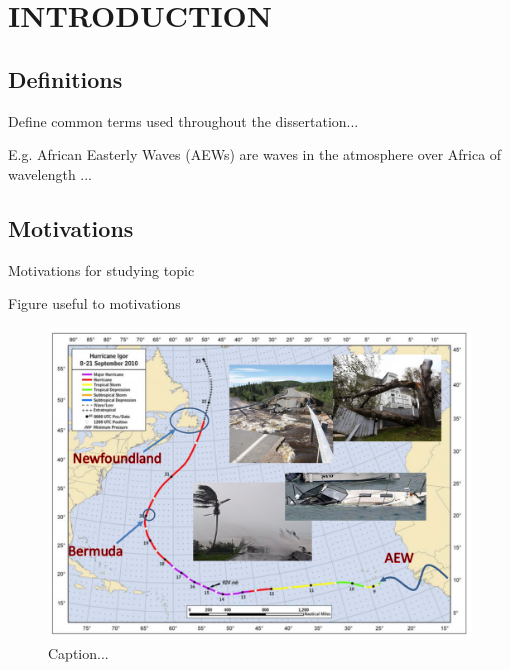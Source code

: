 \chapter{INTRODUCTION}
\label{chap-one}

\section{Definitions}
\label{sec:def}

Define common terms used throughout the dissertation... 

E.g. African Easterly Waves (AEWs) are waves in the atmosphere over Africa of wavelength ...

\section{Motivations}
\label{sec:mot}

Motivations for studying topic

Figure useful to motivations

\begin{figure}[htp]
\centering
\includegraphics[width=\textwidth]{Chapter-1/figs/Damage.png}
\caption{Caption...}
\label{fig:damage}
\end{figure}

